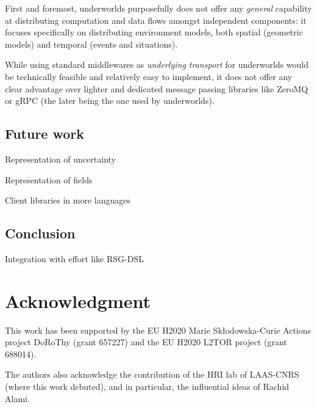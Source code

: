 \documentclass[letterpaper, 10 pt, conference]{ieeeconf}  %
\newcommand{\uwds}{{\sc underworlds}\xspace}
\begin{document}
First and foremost, \uwds purposefully does not offer any \emph{general}
capability at distributing computation and data flows amongst independent
components: it focuses specifically on distributing environment models, both
spatial (geometric models) and temporal (events and situations).

While using standard middlewares as \emph{underlying transport} for \uwds would be
technically feasible and relatively easy to implement, it does not offer any
clear advantage over lighter and dedicated message passing libraries like ZeroMQ
or gRPC (the later being the one used by \uwds).

\subsection{Future work}
\label{futurework}

Representation of uncertainty

Representation of fields

Client libraries in more languages


\subsection{Conclusion}

Integration with effort like RSG-DSL~\cite{blumenthal2014towards}

\section*{Acknowledgment}

This work has been supported by the EU H2020 Marie Sk\l odowska-Curie Actions
project DoRoThy (grant 657227) and the EU H2020 L2TOR project (grant 688014).

The authors also acknowledge the contribution of the HRI lab of LAAS-CNRS (where this
work debuted), and in particular, the influential ideas of Rachid Alami.



\end{document}
